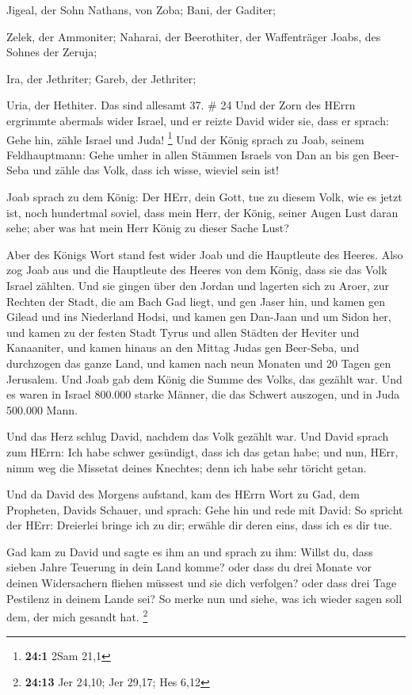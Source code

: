  Jigeal, der Sohn Nathans, von Zoba; Bani, der Gaditer;

 Zelek, der Ammoniter; Naharai, der Beerothiter, der
Waffenträger Joabs, des Sohnes der Zeruja;

 Ira, der Jethriter; Gareb, der Jethriter;

 Uria, der Hethiter. Das sind allesamt 37. \# 24
 Und der Zorn des HErrn ergrimmte abermals wider Israel, und
er reizte David wider sie, dass er sprach: Gehe hin, zähle Israel und
Juda! \footnote{\textbf{24:1} 2Sam 21,1}  Und der König
sprach zu Joab, seinem Feldhauptmann: Gehe umher in allen Stämmen
Israels von Dan an bis gen Beer-Seba und zähle das Volk, dass ich wisse,
wieviel sein ist!

 Joab sprach zu dem König: Der HErr, dein Gott, tue zu
diesem Volk, wie es jetzt ist, noch hundertmal soviel, dass mein Herr,
der König, seiner Augen Lust daran sehe; aber was hat mein Herr König zu
dieser Sache Lust?

 Aber des Königs Wort stand fest wider Joab und die
Hauptleute des Heeres. Also zog Joab aus und die Hauptleute des Heeres
von dem König, dass sie das Volk Israel zählten.  Und sie
gingen über den Jordan und lagerten sich zu Aroer, zur Rechten der
Stadt, die am Bach Gad liegt, und gen Jaser hin,  und kamen
gen Gilead und ins Niederland Hodsi, und kamen gen Dan-Jaan und um Sidon
her,  und kamen zu der festen Stadt Tyrus und allen Städten
der Heviter und Kanaaniter, und kamen hinaus an den Mittag Judas gen
Beer-Seba,  und durchzogen das ganze Land, und kamen nach
neun Monaten und 20 Tagen gen Jerusalem.  Und Joab gab dem
König die Summe des Volks, das gezählt war. Und es waren in Israel
800.000 starke Männer, die das Schwert auszogen, und in Juda 500.000
Mann.

 Und das Herz schlug David, nachdem das Volk gezählt war.
Und David sprach zum HErrn: Ich habe schwer gesündigt, dass ich das
getan habe; und nun, HErr, nimm weg die Missetat deines Knechtes; denn
ich habe sehr töricht getan.

 Und da David des Morgens aufstand, kam des HErrn Wort zu
Gad, dem Propheten, Davids Schauer, und sprach:  Gehe hin
und rede mit David: So spricht der HErr: Dreierlei bringe ich zu dir;
erwähle dir deren eins, dass ich es dir tue.

 Gad kam zu David und sagte es ihm an und sprach zu ihm:
Willst du, dass sieben Jahre Teuerung in dein Land komme? oder dass du
drei Monate vor deinen Widersachern fliehen müssest und sie dich
verfolgen? oder dass drei Tage Pestilenz in deinem Lande sei? So merke
nun und siehe, was ich wieder sagen soll dem, der mich gesandt hat.
\footnote{\textbf{24:13} Jer 24,10; Jer 29,17; Hes 6,12}

